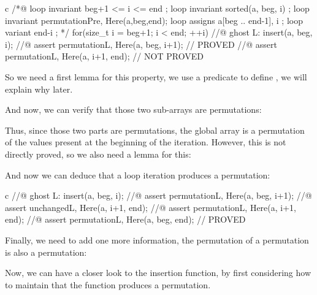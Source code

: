 \begin{CodeBlock}{c}
  /*@
    loop invariant beg+1 <= i <= end ;
    loop invariant sorted(a, beg, i) ;
    loop invariant permutation{Pre, Here}(a,beg,end);
    loop assigns a[beg .. end-1], i ;
    loop variant end-i ;
  */
  for(size_t i = beg+1; i < end; ++i) {
    //@ ghost L:
    insert(a, beg, i);
    //@ assert permutation{L, Here}(a, beg, i+1); // PROVED
    //@ assert permutation{L, Here}(a, i+1, end); // NOT PROVED
  }
\end{CodeBlock}

So we need a first lemma for this property, we use a predicate
 to define , we will explain why
later.


And now, we can verify that those two sub-arrays are permutations:




Thus, since those two parts are permutations, the global array is a permutation
of the values present at the beginning of the iteration. However, this is not
directly proved, so we also need a lemma for this:





And now we can deduce that a loop iteration produces a permutation:



\begin{CodeBlock}{c}
    //@ ghost L:
    insert(a, beg, i);
    //@ assert permutation{L, Here}(a, beg, i+1);
    //@ assert unchanged{L, Here}(a, i+1, end);
    //@ assert permutation{L, Here}(a, i+1, end);
    //@ assert permutation{L, Here}(a, beg, end); // PROVED
\end{CodeBlock}



Finally, we need to add one more information, the permutation of a permutation
is also a permutation:






Now, we can have a closer look to the insertion function, by first considering
how to maintain that the function produces a permutation.




